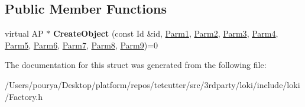 \subsection*{Public Member Functions}
\begin{DoxyCompactItemize}
\item 
\hypertarget{structLoki_1_1FactoryImpl_3_01AP_00_01Id_00_01LOKI__TYPELIST__9_07P1_00_01P2_00_01P3_00_01P4_00_61172a57a9caff70ed7c652ec4ff7081_a3defc11ca2bc1c5cd9707067ddf577c1}{}virtual A\+P $\ast$ {\bfseries Create\+Object} (const Id \&id, \hyperlink{classLoki_1_1EmptyType}{Parm1}, \hyperlink{classLoki_1_1EmptyType}{Parm2}, \hyperlink{classLoki_1_1EmptyType}{Parm3}, \hyperlink{classLoki_1_1EmptyType}{Parm4}, \hyperlink{classLoki_1_1EmptyType}{Parm5}, \hyperlink{classLoki_1_1EmptyType}{Parm6}, \hyperlink{classLoki_1_1EmptyType}{Parm7}, \hyperlink{classLoki_1_1EmptyType}{Parm8}, \hyperlink{classLoki_1_1EmptyType}{Parm9})=0\label{structLoki_1_1FactoryImpl_3_01AP_00_01Id_00_01LOKI__TYPELIST__9_07P1_00_01P2_00_01P3_00_01P4_00_61172a57a9caff70ed7c652ec4ff7081_a3defc11ca2bc1c5cd9707067ddf577c1}

\end{DoxyCompactItemize}


The documentation for this struct was generated from the following file\+:\begin{DoxyCompactItemize}
\item 
/\+Users/pourya/\+Desktop/platform/repos/tetcutter/src/3rdparty/loki/include/loki/Factory.\+h\end{DoxyCompactItemize}
